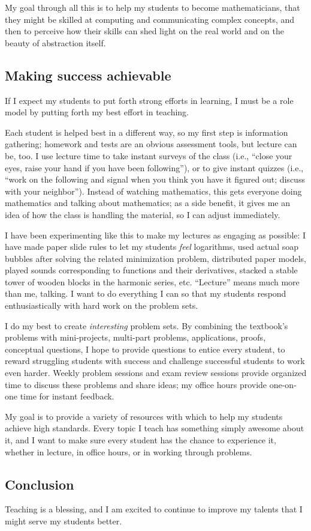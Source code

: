 \documentclass[12pt]{amsart}
\begin{document}
My goal through all this is to help my students to become
mathematicians, that they might be skilled at computing and
communicating complex concepts, and then to perceive how their skills
can shed light on the real world and on the beauty of abstraction
itself.

\subsection*{Making success achievable}

If I expect my students to put forth strong efforts in learning, I
must be a role model by putting forth my best effort in teaching.

Each student is helped best in a different way, so my first step is
information gathering; homework and tests are an obvious assessment
tools, but lecture can be, too.  I use lecture time to take instant
surveys of the class (i.e., ``close your eyes, raise your hand if you
have been following''), or to give instant quizzes (i.e., ``work on
the following and signal when you think you have it figured out;
discuss with your neighbor'').  Instead of watching mathematics, this
gets everyone doing mathematics and talking about mathematics; as a
side benefit, it gives me an idea of how the class is handling the
material, so I can adjust immediately.

I have been experimenting like this to make my lectures as engaging as
possible: I have made paper slide rules to let my students \textit{feel}
logarithms, used actual soap bubbles after solving the related
minimization problem, distributed paper models, played sounds
corresponding to functions and their derivatives, stacked a stable
tower of wooden blocks in the harmonic series, etc.  ``Lecture'' means
much more than me, talking.  I want to do everything I can so that my
students respond enthusiastically with hard work on the problem sets.

I do my best to create \textit{interesting} problem sets.  By
combining the textbook's problems with mini-projects, multi-part
problems, applications, proofs, conceptual questions, I hope to
provide questions to entice every student, to reward struggling
students with success and challenge successful students to work even
harder.  Weekly problem sessions and exam review sessions provide
organized time to discuss these problems and share ideas; my office
hours provide one-on-one time for instant feedback.

My goal is to provide a variety of resources with which to help my
students achieve high standards.  Every topic I teach has something
simply awesome about it, and I want to make sure every student has the
chance to experience it, whether in lecture, in office hours, or in working through problems.

\subsection*{Conclusion}

Teaching is a blessing, and I am excited to continue to improve my
talents that I might serve my students better.
\end{document}
